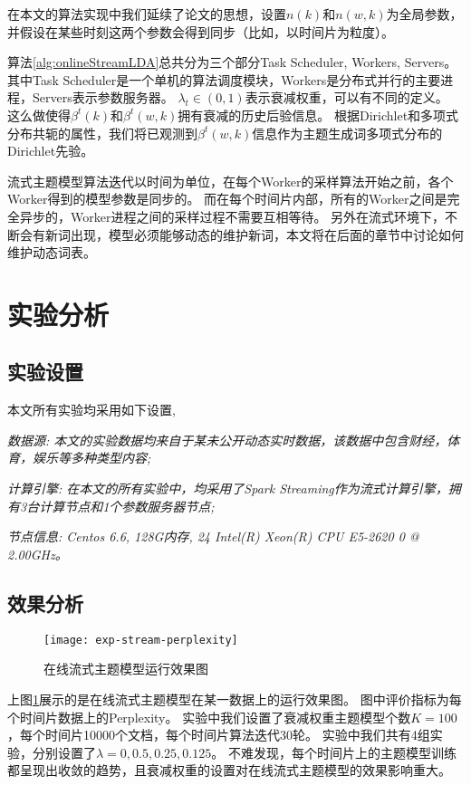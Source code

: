在本文的算法实现中我们延续了论文\cite{smola2010an}的思想，设置$n(k)$和$n(w, k)$为全局参数，
并假设在某些时刻这两个参数会得到同步（比如，以时间片为粒度）。

算法\ref{alg:onlineStreamLDA}总共分为三个部分Task Scheduler, Workers, Servers。
其中Task Scheduler是一个单机的算法调度模块，Workers是分布式并行的主要进程，Servers表示参数服务器。
$\lambda_t \in (0, 1)$表示衰减权重，可以有不同的定义。
这么做使得$\beta^t(k)$和$\beta^t(w, k)$拥有衰减的历史后验信息。
根据Dirichlet和多项式分布共轭的属性，我们将已观测到$\beta^t(w, k)$信息作为主题生成词多项式分布的Dirichlet先验。

流式主题模型算法迭代以时间为单位，在每个Worker的采样算法开始之前，各个Worker得到的模型参数是同步的。
而在每个时间片内部，所有的Worker之间是完全异步的，Worker进程之间的采样过程不需要互相等待。
另外在流式环境下，不断会有新词出现，模型必须能够动态的维护新词，本文将在后面的章节中讨论如何维护动态词表。

\section{实验分析}

\subsection{实验设置}
本文所有实验均采用如下设置,

\em{数据源:} 本文的实验数据均来自于某未公开动态实时数据，该数据中包含财经，体育，娱乐等多种类型内容;

\em{计算引擎:} 在本文的所有实验中，均采用了Spark Streaming作为流式计算引擎，拥有3台计算节点和1个参数服务器节点;

\em{节点信息:} Centos 6.6, 128G内存, 24 Intel(R) Xeon(R) CPU E5-2620 0 @ 2.00GHz。

\subsection{效果分析}
\begin{figure}[htb]\centering
  \texttt{[image: exp-stream-perplexity]}
  \caption{在线流式主题模型运行效果图}
  \label{fig:exp-stream-perplexity}       %
\end{figure}

上图\ref{fig:exp-stream-perplexity}展示的是在线流式主题模型在某一数据上的运行效果图。
图中评价指标为每个时间片数据上的Perplexity。
实验中我们设置了衰减权重主题模型个数$K = 100$，每个时间片10000个文档，每个时间片算法迭代30轮。
实验中我们共有4组实验，分别设置了$\lambda = 0, 0.5, 0.25, 0.125$。
不难发现，每个时间片上的主题模型训练都呈现出收敛的趋势，且衰减权重的设置对在线流式主题模型的效果影响重大。

